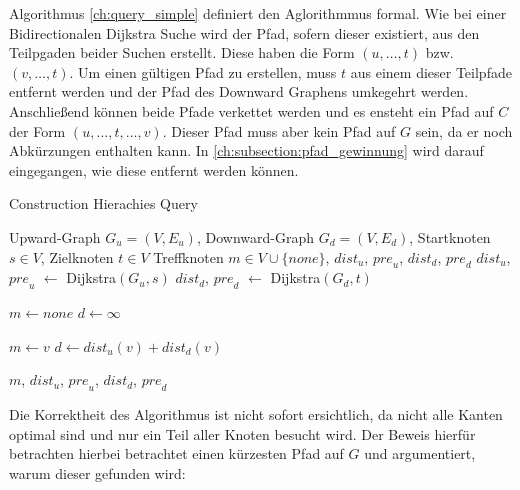 Algorithmus \ref{ch:query_simple} definiert den Aglorithmmus formal.
Wie bei einer Bidirectionalen Dijkstra Suche wird der Pfad, sofern dieser existiert, aus den Teilpgaden beider Suchen erstellt.
Diese haben die Form $(u, \dotsc, t)$ bzw. $(v, \dotsc, t)$.
Um einen gültigen Pfad zu erstellen, muss $t$ aus einem dieser Teilpfade entfernt werden und der Pfad des Downward Graphens umkegehrt werden.
Anschließend können beide Pfade verkettet werden und es ensteht ein Pfad auf $C$ der Form $(u, \dotsc, t, \dotsc, v)$.
Dieser Pfad muss aber kein Pfad auf $G$ sein, da er noch Abkürzungen enthalten kann.
In \autoref{ch:subsection:pfad_gewinnung} wird darauf eingegangen, wie diese entfernt werden können.

\begin{algorithm}[ht]
    \caption{Construction Hierachies Query}
    \begin{algorithmic}[1]
        \Require Upward-Graph $G_u = (V, E_u)$, Downward-Graph $G_d = (V, E_d)$, Startknoten $s \in V$, Zielknoten $t \in V$
        \Ensure Treffknoten $m \in V \cup \{ {none} \}$, ${dist}_u$, ${pre}_u$, ${dist}_d$, ${pre}_d$
        \State ${dist}_u$, ${pre}_u$ $\leftarrow$ Dijkstra$(G_u, s)$
        \State ${dist}_d$, ${pre}_d$ $\leftarrow$ Dijkstra$(G_d, t)$

        \State
        \State $m \leftarrow {none}$
        \State $d \leftarrow \infty$
        \State

        \State $m \leftarrow v$
        \State $d \leftarrow {dist}_u(v) + {dist}_d(v)$
        \EndIf
        \EndFor

        \State
        \State \Return $m$, ${dist}_u$, ${pre}_u$, ${dist}_d$, ${pre}_d$
    \end{algorithmic}
    \label{ch:query_simple}
\end{algorithm}

Die Korrektheit des Algorithmus ist nicht sofort ersichtlich, da nicht alle Kanten optimal sind und nur ein Teil aller Knoten besucht wird.
Der Beweis hierfür betrachten hierbei betrachtet einen kürzesten Pfad auf $G$ und argumentiert, warum dieser gefunden wird:

